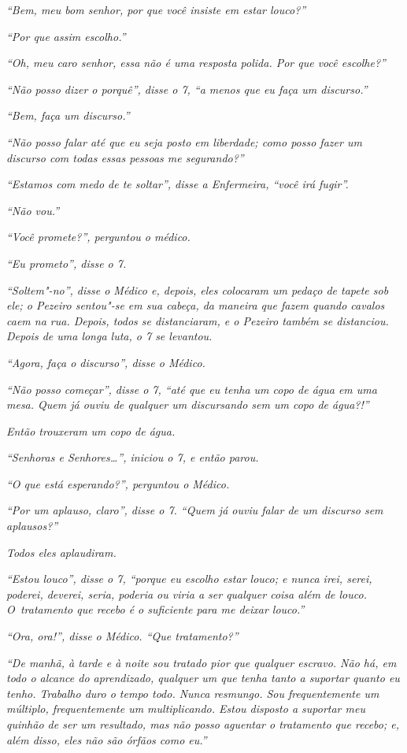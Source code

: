 \emph{``Bem, meu bom senhor, por que você insiste em estar louco?''}

\emph{``Por que assim escolho.''}

\emph{``Oh, meu caro senhor, essa não é uma resposta polida. Por que
você escolhe?''}

\emph{``Não posso dizer o porquê'', disse o 7, ``a menos que eu faça um
discurso.''}

\emph{``Bem, faça um discurso.''}

\emph{``Não posso falar até que eu seja posto em liberdade; como posso
fazer um discurso com todas essas pessoas me segurando?''}

\emph{``Estamos com medo de te soltar'', disse a Enfermeira, ``você irá
fugir''.}

\emph{``Não vou.''}

\emph{``Você promete?'', perguntou o médico.}

\emph{``Eu prometo'', disse o 7.}

\emph{``Soltem"-no'', disse o Médico e, depois, eles colocaram um
pedaço de tapete sob ele; o Pezeiro sentou"-se em sua cabeça, da maneira
que fazem quando cavalos caem na rua. Depois, todos se distanciaram, e o
Pezeiro também se distanciou. Depois de uma longa luta, o 7 se
levantou.}

\emph{``Agora, faça o discurso'', disse o Médico.}

\emph{``Não posso começar'', disse o 7, ``até que eu tenha um copo de
água em uma mesa. Quem já ouviu de qualquer um discursando sem um copo
de água?!''}

\emph{Então trouxeram um copo de água.}

\emph{``Senhoras e Senhores\ldots{}'', iniciou o 7, e então parou.}

\emph{``O que está esperando?'', perguntou o Médico.}

\emph{``Por um aplauso, claro'', disse o 7. ``Quem já ouviu falar de um
discurso sem aplausos?''}

\emph{Todos eles aplaudiram.}

\emph{``Estou louco'', disse o 7, ``porque eu escolho estar louco; e
nunca irei, serei, poderei, deverei, seria, poderia ou viria a ser
qualquer coisa além de louco. O~tratamento que recebo é o suficiente
para me deixar louco.''}

\emph{``Ora, ora!'', disse o Médico. ``Que tratamento?''}

\emph{``De manhã, à tarde e à noite sou tratado pior que qualquer
escravo. Não há, em todo o alcance do aprendizado, qualquer um que
tenha tanto a suportar quanto eu tenho. Trabalho duro o tempo todo.
Nunca resmungo. Sou frequentemente um múltiplo, frequentemente um
multiplicando. Estou disposto a suportar meu quinhão de ser um
resultado, mas não posso aguentar o tratamento que recebo; e, além
disso, eles não são órfãos como eu.''}

